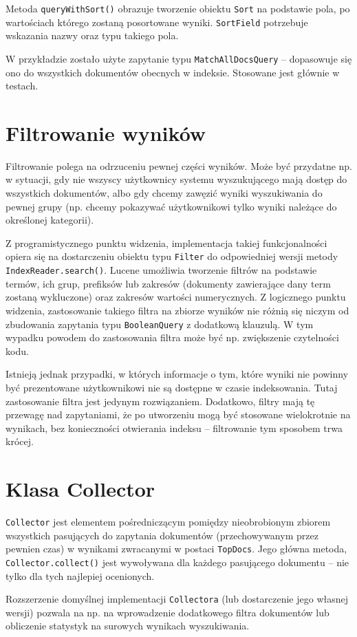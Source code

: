 Metoda \texttt{queryWithSort()} obrazuje tworzenie obiektu \texttt{Sort} na podstawie pola, po wartościach którego zostaną posortowane wyniki. \texttt{SortField} potrzebuje wskazania nazwy oraz typu takiego pola. 

W przykładzie zostało użyte zapytanie typu \texttt{MatchAllDocsQuery} -- dopasowuje się ono do wszystkich dokumentów obecnych w indeksie. Stosowane jest głównie w testach.

\section{Filtrowanie wyników}

Filtrowanie polega na odrzuceniu pewnej części wyników. Może być przydatne np. w sytuacji, gdy nie wszyscy użytkownicy systemu wyszukującego mają dostęp do wszystkich dokumentów, albo gdy chcemy zawęzić wyniki wyszukiwania do pewnej grupy (np. chcemy pokazywać użytkownikowi tylko wyniki należące do określonej kategorii).

Z programistycznego punktu widzenia, implementacja takiej funkcjonalności opiera się na dostarczeniu obiektu typu \texttt{Filter} do odpowiedniej wersji metody \texttt{IndexReader.search()}. Lucene umożliwia tworzenie filtrów na podstawie termów, ich grup, prefiksów lub zakresów (dokumenty zawierające dany term zostaną wykluczone) oraz zakresów wartości numerycznych. Z logicznego punktu widzenia, zastosowanie takiego filtra na zbiorze wyników nie różnią się niczym od zbudowania zapytania typu \texttt{BooleanQuery} z dodatkową klauzulą. W tym wypadku powodem do zastosowania filtra może być np. zwiększenie czytelności kodu. 

Istnieją jednak przypadki, w których informacje o tym, które wyniki nie powinny być prezentowane użytkownikowi nie są dostępne w czasie indeksowania. Tutaj zastosowanie filtra jest jedynym rozwiązaniem. Dodatkowo, filtry mają tę przewagę nad zapytaniami, że po utworzeniu mogą być stosowane wielokrotnie na wynikach, bez konieczności otwierania indeksu -- filtrowanie tym sposobem trwa krócej. 

\section{Klasa Collector}

\texttt{Collector} jest elementem pośredniczącym pomiędzy nieobrobionym zbiorem wszystkich pasujących do zapytania dokumentów (przechowywanym przez pewnien czas) w wynikami zwracanymi w postaci \texttt{TopDocs}. Jego główna metoda, \texttt{Collector.collect()} jest wywoływana dla każdego pasującego dokumentu -- nie tylko dla tych najlepiej ocenionych. 

Rozszerzenie domyślnej implementacji \texttt{Collectora} (lub dostarczenie jego własnej wersji) pozwala na np. na wprowadzenie dodatkowego filtra dokumentów lub obliczenie statystyk na surowych wynikach wyszukiwania.